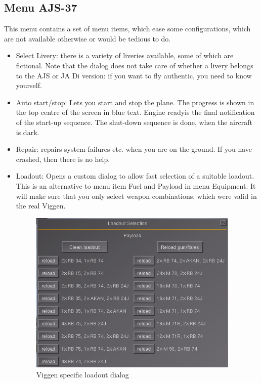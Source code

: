 \subsection{Menu AJS-37}
This menu contains a set of menu items, which ease some configurations, which are not available otherwise or would be tedious to do.
\begin{itemize}
\item Select Livery: there is a variety of liveries available, some of which are fictional. Note that the dialog does not take care of whether a livery belongs to the AJS or JA Di version: if you want to fly authentic, you need to know yourself.
\item Auto start/stop: Lets you start and stop the plane. The progress is shown in the top centre of the screen in blue text. \glqq Engine ready\grqq is the final notification of the start-up sequence. The shut-down sequence is done, when the aircraft is dark.
\item Repair: repairs system failures etc. when you are on the ground. If you have crashed, then there is no help.
\item Loadout: Opens a custom dialog to allow fast selection of a suitable loadout. This is an alternative to menu item Fuel and Payload in menu Equipment. It will make sure that you only select weapon combinations, which were valid in the real Viggen.

\begin{figure}[h]
\centering
 \includegraphics[width=10cm]{images/fg_loadout_dialog.png}
 \caption{Viggen specific loadout dialog}
\end{figure}


\end{itemize}
